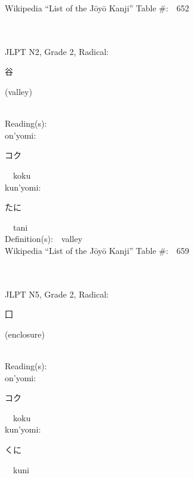 \begin{multicols}{2}
Wikipedia ``List of the J\=oy\=o Kanji'' Table \#:\ \ 652 \\
\ \ \\
{\fontsize{34pt}{40pt}  }\ \ \\  %
{JLPT N2, Grade 2, Radical:\ \ {\begin{CJK}{UTF8}{min} 谷 \end{CJK}} (valley) } \\
Reading(s):\ \ \\
{\hspace*{1em}}on'yomi:\ \ \\
{\hspace*{2em}}{\begin{CJK}{UTF8}{min} コク \end{CJK}}\ \ koku\ \ \\
{\hspace*{1em}}kun'yomi:\ \ \\
{\hspace*{2em}}{\begin{CJK}{UTF8}{min} たに \end{CJK}}\ \ tani\ \ \\
Definition(s):\ \ valley \\
Wikipedia ``List of the J\=oy\=o Kanji'' Table \#:\ \ 659 \\
\ \ \\
{\fontsize{34pt}{40pt}  }\ \ \\  %
{JLPT N5, Grade 2, Radical:\ \ {\begin{CJK}{UTF8}{min} 囗 \end{CJK}} (enclosure) } \\
Reading(s):\ \ \\
{\hspace*{1em}}on'yomi:\ \ \\
{\hspace*{2em}}{\begin{CJK}{UTF8}{min} コク \end{CJK}}\ \ koku\ \ \\
{\hspace*{1em}}kun'yomi:\ \ \\
{\hspace*{2em}}{\begin{CJK}{UTF8}{min} くに \end{CJK}}\ \ kuni\ \ \\

\end{multicols}
